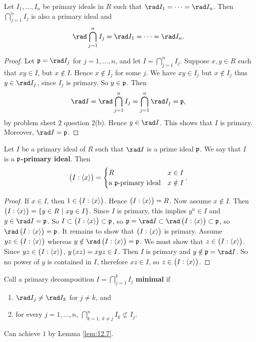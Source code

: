 \begin{lemma}
\label{lem:12.7}
Let $ I_1, \dots, I_n $ be primary ideals in $ R $ such that $ \rad I_1 = \dots = \rad I_n $. Then $ \bigcap_{j = 1}^n I_j $ is also a primary ideal and
$$ \rad \bigcap_{j = 1}^n I_j = \rad I_1 = \dots = \rad I_n. $$
\end{lemma}

\begin{proof}
Let $ \ppp = \rad I_j $ for $ j = 1, \dots, n $, and let $ I = \bigcap_{j = 1}^n I_j $. Suppose $ x, y \in R $ such that $ xy \in I $, but $ x \notin I $. Hence $ x \notin I_j $ for some $ j $. We have $ xy \in I_j $ but $ x \notin I_j $ thus $ y \in \rad I_j $, since $ I_j $ is primary. So $ y \in \mathfrak{p} $. Then
$$ \rad I = \rad \bigcap_{j = 1}^n I_j = \bigcap_{j = 1}^n \rad I_j = \ppp, $$
by problem sheet $ 2 $ question $ 2 $(b). Hence $ y \in \rad I $. This shows that $ I $ is primary. Moreover, $ \rad I = \ppp $.
\end{proof}

\begin{lemma}
\label{lem:12.8}
Let $ I $ be a primary ideal of $ R $ such that $ \rad I $ is a prime ideal $ \mathfrak{p} $. We say that $ I $ is a \textbf{$ \mathfrak{p} $-primary ideal}. Then
$$ \br{I : \abr{x}} =
\begin{cases}
R & x \in I \\
\text{a $ \ppp $-primary ideal} & x \notin I
\end{cases}.
$$
\end{lemma}

\begin{proof}
If $ x \in I $, then $ 1 \in \br{I : \abr{x}} $. Hence $ \br{I : \abr{x}} = R $. Now assume $ x \notin I $. Then $ \br{I : \abr{x}} = \cbr{y \in R \st xy \in I} $. Since $ I $ is primary, this implies $ y^n \in I $ and $ y \in \rad I = \ppp $. So $ I \subset \br{I : \abr{x}} \subset \ppp $, so $ \ppp = \rad I \subset \rad \br{I : \abr{x}} \subset \ppp $, so $ \rad \br{I : \abr{x}} = \ppp $. It remains to show that $ \br{I : \abr{x}} $ is primary. Assume $ yz \in \br{I : \abr{x}} $ whereas $ y \notin \rad \br{I : \abr{x}} = \ppp $. We must show that $ z \in \br{I : \abr{x}} $. Since $ yz \in \br{I : \abr{x}} $, $ y\br{xz} = xyz \in I $. Then $ I $ is primary and $ y \notin \ppp = \rad I $. So no power of $ y $ is contained in $ I $, therefore $ xz \in I $, so $ z \in \br{I : \abr{x}} $.
\end{proof}

\pagebreak

Call a primary decomposition $ I = \bigcap_{j = 1}^k I_j $ \textbf{minimal} if
\begin{enumerate}
\item $ \rad I_j \ne \rad I_k $ for $ j \ne k $, and
\item for every $ j = 1, \dots, n $, $ \bigcap_{k = 1, \ k \ne j}^n I_k \not\subset I_j $.
\end{enumerate}
Can achieve $ 1 $ by Lemma \ref{lem:12.7}.

